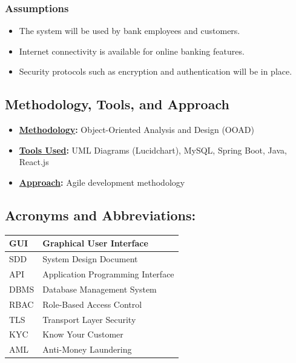 \subsubsection{Assumptions}\label{assumptions}

\begin{itemize}
\item
  The system will be used by bank employees and customers.
\item
  Internet connectivity is available for online banking features.
\item
  Security protocols such as encryption and authentication will be in
  place.
\end{itemize}

\subsection{Methodology, Tools, and
Approach}\label{methodology-tools-and-approach}

\begin{itemize}
\item
  \textbf{\ul{Methodology}:} Object-Oriented Analysis and Design (OOAD)
\item
  \textbf{\ul{Tools Used}:} UML Diagrams (Lucidchart), MySQL, Spring
  Boot, Java, React.js
\item
  \textbf{\ul{Approach}:} Agile development methodology
\end{itemize}

\subsection{Acronyms and
Abbreviations:}\label{acronyms-and-abbreviations}

\begin{longtable}[]{@{}
  >{\centering\arraybackslash}p{}
  >{\centering\arraybackslash}p{}@{}}
\toprule\noalign{}
\begin{minipage}[b]{\linewidth}\centering
GUI
\end{minipage} & \begin{minipage}[b]{\linewidth}\centering
Graphical User Interface
\end{minipage} \\
\midrule\noalign{}
\endhead
\bottomrule\noalign{}
\endlastfoot
SDD & System Design Document \\
API & Application Programming Interface \\
DBMS & Database Management System \\
RBAC & Role-Based Access Control \\
TLS & Transport Layer Security \\
KYC & Know Your Customer \\
AML & Anti-Money Laundering \\
\end{longtable}

